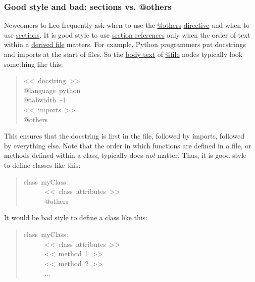 \documentclass[10pt,a4paper,english]{article}
\begin{document}

\hypertarget{good-style-and-bad-sections-vs-others}{}
\subsubsection*{Good style and bad:  sections vs. @others}

Newcomers to Leo frequently ask when to use the \href{glossary.html\#others}{@others} \href{\#leo-directives}{directive} and when
to use \href{glossary.html\#section}{sections}. It is good style to use \href{glossary.html\#section-references}{section references} only when the
order of text within a \href{\#derived-files}{derived file} matters. For example, Python programmers
put docstrings and imports at the start of files. So the \href{glossary.html\#body-text}{body text} of
\href{glossary.html\#file}{@file} nodes typically look something like this:
\begin{quote}{\ttfamily \raggedright \noindent
<{}<~docstring~>{}>~\\
@language~python~\\
@tabwidth~-4~\\
<{}<~imports~>{}>~\\
@others
}\end{quote}

This ensures that the docstring is first in the file, followed by imports,
followed by everything else. Note that the order in which functions are defined
in a file, or methods defined within a class, typically does \emph{not} matter. Thus,
it is good style to define classes like this:
\begin{quote}{\ttfamily \raggedright \noindent
class~myClass:~\\
~~~~~~<{}<~class~attributes~>{}>~\\
~~~~~~@others
}\end{quote}

It would be bad style to define a class like this:
\begin{quote}{\ttfamily \raggedright \noindent
class~myClass:~\\
~~~~~~<{}<~class~attributes~>{}>~\\
~~~~~~<{}<~method~1~>{}>~\\
~~~~~~<{}<~method~2~>{}>~\\
~~~~~~...
}\end{quote}
\end{document}
